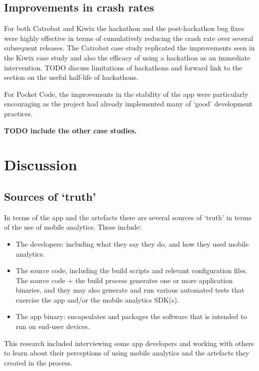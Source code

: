 \subsection{Improvements in crash rates}
For both Catrobat and Kiwix the hackathon and the post-hackathon bug fixes were highly effective in terms of cumulatively reducing the crash rate over several subsequent releases. %
The Catrobat case study replicated the improvements seen in the Kiwix case study and also the efficacy of using a hackathon as an immediate intervention. TODO discuss limitations of hackathons and forward link to the section on the useful half-life of hackathons. 


For Pocket Code, the improvements in the stability of the app were particularly encouraging as the project had already implemented many of `good' development practices.


\textbf{TODO include the other case studies.}

\section{Discussion}\label{apps-and-artefacts-discussion-section}


\subsection{Sources of `truth'}
In terms of the app and the artefacts there are several sources of `truth' in terms of the use of mobile analytics. These include:
\begin{itemize}
    \itemsep0em
    \item The developers: including what they say they do, and how they used mobile analytics.
    \item The source code, including the build scripts and relevant configuration files. The source code + the build process generates one or more application binaries, and they may also generate and run various automated tests that exercise the app and/or the mobile analytics SDK(s).
    \item The app binary: encapsulates and packages the software that is intended to run on end-user devices. 
\end{itemize}

This research included interviewing some app developers and working with others to learn about their perceptions of using mobile analytics and the artefacts they created in the process.

